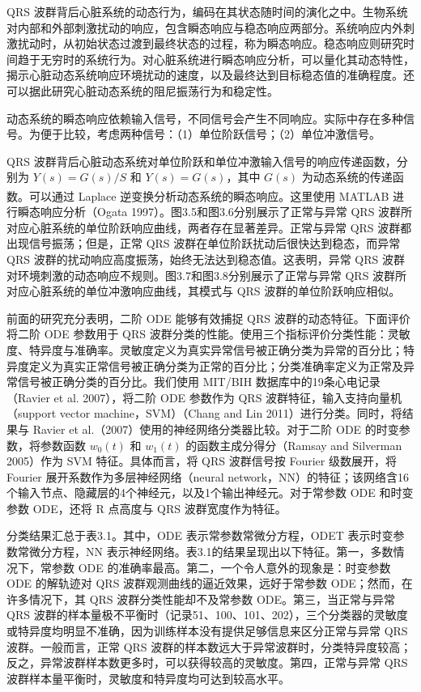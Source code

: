 QRS 波群背后心脏系统的动态行为，编码在其状态随时间的演化之中。生物系统对内部和外部刺激扰动的响应，包含瞬态响应与稳态响应两部分。系统响应内外刺激扰动时，从初始状态过渡到最终状态的过程，称为瞬态响应。稳态响应则研究时间趋于无穷时的系统行为。对心脏系统进行瞬态响应分析，可以量化其动态特性，揭示心脏动态系统响应环境扰动的速度，以及最终达到目标稳态值的准确程度。还可以据此研究心脏动态系统的阻尼振荡行为和稳定性。

动态系统的瞬态响应依赖输入信号，不同信号会产生不同响应。实际中存在多种信号。为便于比较，考虑两种信号：（1）单位阶跃信号；（2）单位冲激信号。

QRS 波群背后心脏动态系统对单位阶跃和单位冲激输入信号的响应传递函数，分别为 $Y(s)=G(s)/S$ 和 $Y(s)=G(s)$，其中 $G(s)$ 为动态系统的传递函数。可以通过 Laplace 逆变换分析动态系统的瞬态响应。这里使用 MATLAB\textsuperscript{\textregistered} 进行瞬态响应分析（Ogata 1997）。图3.5和图3.6分别展示了正常与异常 QRS 波群所对应心脏系统的单位阶跃响应曲线，两者存在显著差异。正常与异常 QRS 波群都出现信号振荡；但是，正常 QRS 波群在单位阶跃扰动后很快达到稳态，而异常 QRS 波群的扰动响应高度振荡，始终无法达到稳态值。这表明，异常 QRS 波群对环境刺激的动态响应不规则。图3.7和图3.8分别展示了正常与异常 QRS 波群所对应心脏系统的单位冲激响应曲线，其模式与 QRS 波群的单位阶跃响应相似。





\FloatBarrier


前面的研究充分表明，二阶 ODE 能够有效捕捉 QRS 波群的动态特征。下面评价将二阶 ODE 参数用于 QRS 波群分类的性能。使用三个指标评价分类性能：灵敏度、特异度与准确率。灵敏度定义为真实异常信号被正确分类为异常的百分比；特异度定义为真实正常信号被正确分类为正常的百分比；分类准确率定义为正常及异常信号被正确分类的百分比。我们使用 MIT/BIH 数据库中的19条心电记录（Ravier et al. 2007），将二阶 ODE 参数作为 QRS 波群特征，输入支持向量机（support vector machine，SVM）（Chang and Lin 2011）进行分类。同时，将结果与 Ravier et al.（2007）使用的神经网络分类器比较。对于二阶 ODE 的时变参数，将参数函数 $w_0(t)$ 和 $w_1(t)$ 的函数主成分得分（Ramsay and Silverman 2005）作为 SVM 特征。具体而言，将 QRS 波群信号按 Fourier 级数展开，将 Fourier 展开系数作为多层神经网络（neural network，NN）的特征；该网络含16个输入节点、隐藏层的4个神经元，以及1个输出神经元。对于常参数 ODE 和时变参数 ODE，还将 R 点高度与 QRS 波群宽度作为特征。

分类结果汇总于表3.1。其中，ODE 表示常参数常微分方程，ODET 表示时变参数常微分方程，NN 表示神经网络。表3.1的结果呈现出以下特征。第一，多数情况下，常参数 ODE 的准确率最高。第二，一个令人意外的现象是：时变参数 ODE 的解轨迹对 QRS 波群观测曲线的逼近效果，远好于常参数 ODE；然而，在许多情况下，其 QRS 波群分类性能却不及常参数 ODE。第三，当正常与异常 QRS 波群的样本量极不平衡时（记录51、100、101、202），三个分类器的灵敏度或特异度均明显不准确，因为训练样本没有提供足够信息来区分正常与异常 QRS 波群。一般而言，正常 QRS 波群的样本数远大于异常波群时，分类特异度较高；反之，异常波群样本数更多时，可以获得较高的灵敏度。第四，正常与异常 QRS 波群样本量平衡时，灵敏度和特异度均可达到较高水平。


\FloatBarrier
